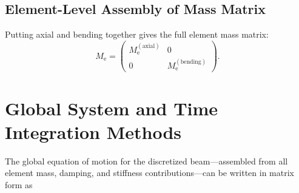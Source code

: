 \documentclass{article}
\begin{document}
	\subsection{Element-Level Assembly of Mass Matrix}
	Putting axial and bending together gives the full element mass matrix:
	\begin{equation}\label{eq:me_assembled}
		M_\mathrm{e}
		= \begin{pmatrix}
			M_\mathrm{e}^{(\mathrm{axial})} & {0}\\
			{0}            & M_\mathrm{e}^{(\mathrm{bending})}
		\end{pmatrix}.
	\end{equation}
	
	\section{Global System and Time Integration Methods}
	
	The global equation of motion for the discretized beam—assembled from all element mass, damping, and stiffness contributions—can be written in matrix form as
	
\end{document}
